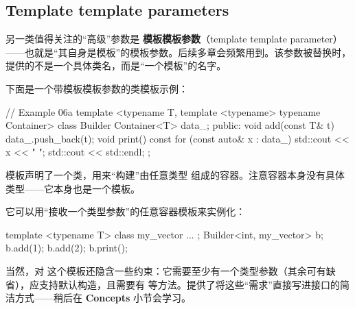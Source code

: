 \subsection{Template template parameters}
另一类值得关注的“高级”参数是 \textbf{模板模板参数}（template template parameter）——也就是“其自身是模板”的模板参数。后续多章会频繁用到。该参数被替换时，提供的不是一个具体类名，而是“一个模板”的名字。

下面是一个带模板模板参数的类模板示例：

\begin{code}
// Example 06a
template <typename T,
         template <typename> typename Container>
class Builder {
  Container<T> data_;
  public:
  void add(const T& t) { data_.push_back(t); }
  void print() const {
    for (const auto& x : data_) std::cout << x << " ";
    std::cout << std::endl;
  }
};
\end{code}

 模板声明了一个类，用来“构建”由任意类型  组成的容器。注意容器本身没有具体类型——它本身也是一个模板。

它可以用“接收一个类型参数”的任意容器模板来实例化：

\begin{code}
template <typename T> class my_vector { ... };
Builder<int, my_vector> b;
b.add(1);
b.add(2);
b.print();
\end{code}

当然，对  这个模板还隐含一些约束：它需要至少有一个类型参数（其余可有缺省），应支持默认构造，且需要有  等方法。\cpp[20] 提供了将这些“需求”直接写进接口的简洁方式——稍后在 \textbf{Concepts} 小节会学习。

